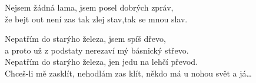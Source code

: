\cho{}

Nejsem žádná lama, jsem posel dobrých zpráv,\\
že bejt out není zas tak zlej stav,tak se mnou slav.

\cho{}
Nepatřím do starýho železa, jsem spíš dřevo,\\
a proto už z podstaty nerezaví mý básnický střevo.\\
Nepatřím do starýho železa, jen jedu na lehčí převod.\\
Chceš-li mě zasklít, nehodlám zas klít, někdo má u nohou svět a já\ldots{}

\cho{}

\esong{}